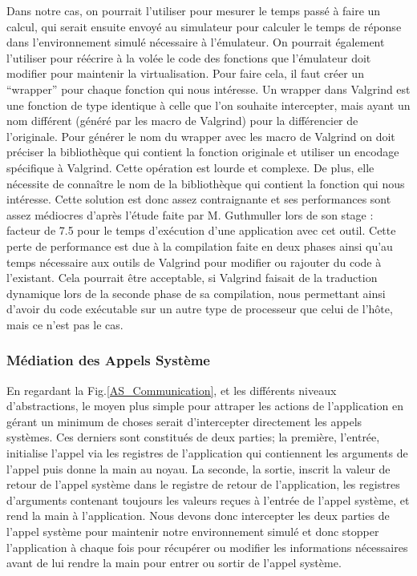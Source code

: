 Dans notre cas, on pourrait l'utiliser pour mesurer le temps passé à faire un
calcul, qui serait ensuite envoyé au simulateur pour calculer le temps de
réponse dans l'environnement simulé nécessaire à l'émulateur. On pourrait
également l'utiliser pour réécrire à la volée le code des fonctions que
l'émulateur doit modifier pour maintenir la virtualisation. Pour faire cela, il
faut créer un ``wrapper'' pour chaque fonction qui nous intéresse. Un wrapper
dans Valgrind est une fonction de type identique à celle que l'on souhaite
intercepter, mais ayant un nom différent (généré par les macro de Valgrind) pour
la différencier de l'originale. Pour générer le nom du wrapper avec les macro de
Valgrind on doit préciser la bibliothèque qui contient la fonction originale et
utiliser un encodage spécifique à Valgrind. Cette opération est lourde et
complexe. De plus, elle nécessite de connaître le nom de la bibliothèque qui
contient la fonction qui nous intéresse. Cette solution est donc assez
contraignante et ses performances sont assez médiocres d'après l'étude faite par
M. Guthmuller lors de son stage \cite{INTERCEPTION:MARION}: facteur de 7.5 pour
le temps d'exécution d'une application avec cet outil. Cette perte de
performance est due à la compilation faite en deux phases ainsi qu'au temps
nécessaire aux outils de Valgrind pour modifier ou rajouter du code à
l'existant. Cela pourrait être acceptable, si Valgrind faisait de la traduction
dynamique lors de la seconde phase de sa compilation, nous permettant ainsi
d'avoir du code exécutable sur un autre type de processeur que celui de l'hôte,
mais ce n'est pas le cas.

\subsubsection{Médiation des Appels Système}

En regardant la Fig.\ref{AS_Communication}, et les différents niveaux
d'abstractions, le moyen plus simple pour attraper les actions de l'application
en gérant un minimum de choses serait d'intercepter directement les appels
systèmes.  Ces derniers sont constitués de deux parties; la première, l'entrée,
initialise l'appel via les registres de l'application qui contiennent les
arguments de l'appel puis donne la main au noyau. La seconde, la sortie, inscrit
la valeur de retour de l'appel système dans le registre de retour de
l'application, les registres d'arguments contenant toujours les valeurs reçues à
l'entrée de l'appel système, et rend la main à l'application. Nous devons donc
intercepter les deux parties de l'appel système pour maintenir notre
environnement simulé et donc stopper l'application à chaque fois pour récupérer
ou modifier les informations nécessaires avant de lui rendre la main pour entrer
ou sortir de l'appel système.

